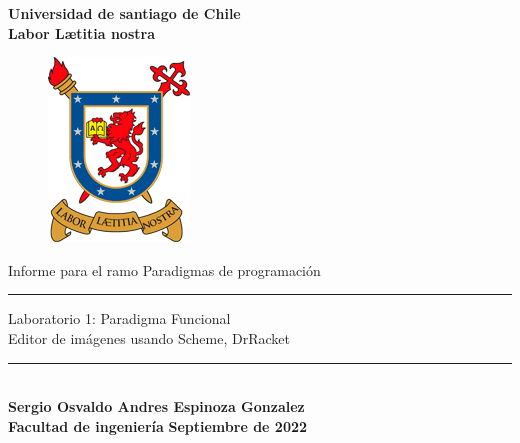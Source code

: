 \begin{titlepage}
    \begin{center}
        {\LARGE \textbf{Universidad de santiago de Chile}}\\
        \vspace{0.25cm}
        {\large \textbf{Labor L\ae titia nostra}}
        \vspace{1cm}
        \begin{figure}[h]
            \centering
            \includegraphics[scale=1.5]{Contenido/Imagenes/Logo color.png}
        \end{figure}
        
        {\Large  Informe para el ramo Paradigmas de programación}
        \vspace{0.3cm}
        \rule{15cm}{0.5mm}
        {\Large Laboratorio 1: Paradigma Funcional\\ Editor de imágenes usando Scheme, DrRacket}
        \rule{15cm}{0.5mm}
        \vspace{2cm}
        \\
        {\Large \textbf{Sergio Osvaldo Andres Espinoza Gonzalez}}\\
        \vspace{0.5cm}
        {\Large \textbf{Facultad de ingeniería}}
        \vfill
        {\Huge \textbf{Septiembre de 2022}}
    \end{center}
\end{titlepage}